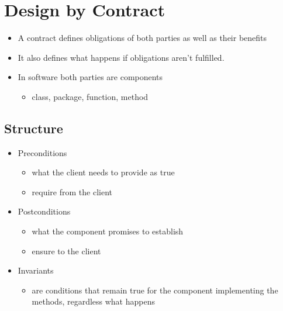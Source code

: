 \hypertarget{design-by-contract}{%
\section{Design by Contract}\label{design-by-contract}}

\begin{itemize}
\tightlist
\item
  A contract defines obligations of both parties as well as their
  benefits
\item
  It also defines what happens if obligations aren't fulfilled.
\item
  In software both parties are components

  \begin{itemize}
  \tightlist
  \item
    class, package, function, method
  \end{itemize}
\end{itemize}

\hypertarget{structure}{%
\subsection{Structure}\label{structure}}

\begin{itemize}
\tightlist
\item
  Preconditions

  \begin{itemize}
  \tightlist
  \item
    what the client needs to provide as true
  \item
    require from the client
  \end{itemize}
\item
  Postconditions

  \begin{itemize}
  \tightlist
  \item
    what the component promises to establish
  \item
    ensure to the client
  \end{itemize}
\item
  Invariants

  \begin{itemize}
  \tightlist
  \item
    are conditions that remain true for the component implementing the
    methods, regardless what happens
  \end{itemize}
\end{itemize}

